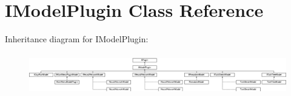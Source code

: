 \hypertarget{class_i_model_plugin}{}\section{I\+Model\+Plugin Class Reference}
\label{class_i_model_plugin}
Inheritance diagram for I\+Model\+Plugin\+:\begin{figure}[H]
\begin{center}
\leavevmode
\includegraphics[height=1.830065cm]{class_i_model_plugin}
\end{center}
\end{figure}
